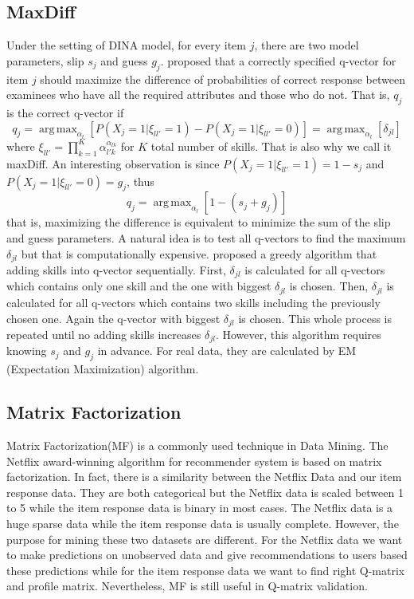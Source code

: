 \documentclass[11pt]{article}
\DeclareMathOperator*{\argmax}{arg\,max}
\begin{document}
\subsection{MaxDiff}
Under the setting of DINA model, for every item $j$, there are two model parameters, slip $s_j$ and guess $g_j$. \cite{de2008empirically} proposed that a correctly specified q-vector for item $j$ should maximize the difference of probabilities of correct response between examinees who have all the required attributes and those who do not. That is, $q_j$ is the correct q-vector if 
$$ q_j=\argmax_{\alpha _l}[P(X_j=1|\xi_{ll'}=1)-P(X_j=1|\xi_{ll'}=0)]=\argmax_{\alpha _l}[\delta_{jl}]$$
where $\xi_{ll'}=\prod_{k=1}^{K}\alpha_{l'k}^{\alpha_{lk}}$ for $K$ total number of skills. That is also why we call it maxDiff. An interesting observation is since $P(X_j=1|\xi_{ll'}=1)=1-s_j$ and $P(X_j=1|\xi_{ll'}=0)=g_j$, thus $$q_j=\argmax_{\alpha _l}[1-(s_j+g_j)]$$ 
that is, maximizing the difference is equivalent to minimize the sum of the slip and guess parameters. A natural idea is to test all q-vectors to find the maximum $\delta_{jl}$ but that is computationally expensive. \cite{de2008empirically} proposed a greedy algorithm that adding skills into q-vector sequentially. First, $\delta_{jl}$ is calculated for all q-vectors which contains only one skill and the one with biggest $\delta_{jl}$ is chosen. Then, $\delta_{jl}$ is calculated for all q-vectors which contains two skills including the previously chosen one. Again the q-vector with biggest $\delta_{jl}$ is chosen. This whole process is repeated until no adding skills increases $\delta_{jl}$. However, this algorithm requires knowing $s_j$ and $g_j$ in advance. For real data, they are calculated by EM (Expectation Maximization) algorithm\cite{de2009dina}.  

\subsection{Matrix Factorization}
Matrix Factorization(MF) is a commonly used technique in Data Mining. The Netflix award-winning algorithm for recommender system is based on matrix factorization\cite{koren2009matrix}. In fact, there is a similarity between the Netflix Data and our item response data. They are both categorical but the Netflix data is scaled between 1 to 5 while the item response data is binary in most cases. The Netflix data is a huge sparse data while the item response data is usually complete. However, the purpose for mining these two datasets are different. For the Netflix data we want to make predictions on unobserved data and give recommendations to users based these predictions while for the item response data we want to find right Q-matrix and profile matrix. Nevertheless, MF is still useful in Q-matrix validation\cite{desmarais2014refinement}. 
\end{document}
